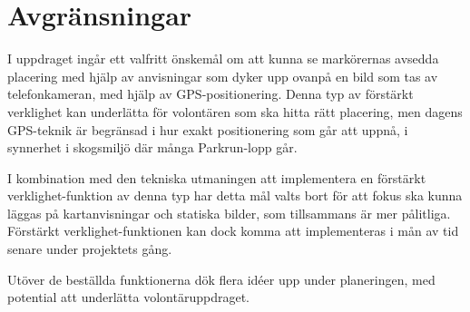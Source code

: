 \section{Avgränsningar}
I uppdraget ingår ett valfritt önskemål om att kunna se markörernas avsedda placering med hjälp av anvisningar som dyker upp ovanpå en bild som tas av telefonkameran, med hjälp av GPS-positionering. 
Denna typ av förstärkt verklighet kan underlätta för volontären som ska hitta rätt placering, men dagens GPS-teknik är begränsad i hur exakt positionering som går att uppnå, i synnerhet i skogsmiljö där många Parkrun-lopp går.

I kombination med den tekniska utmaningen att implementera en förstärkt verklighet-funktion av denna typ har detta mål valts bort för att fokus ska kunna läggas på kartanvisningar och statiska bilder, som tillsammans är mer pålitliga. 
Förstärkt verklighet-funktionen kan dock komma att implementeras i mån av tid senare under projektets gång.

Utöver de beställda funktionerna dök flera idéer upp under planeringen, med potential att underlätta %
volontäruppdraget.


